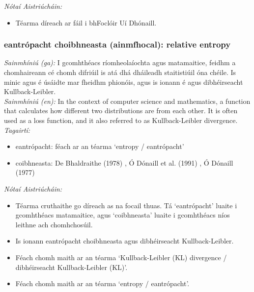  \noindent \textit{Nótaí Aistriúcháin:}
\begin{itemize}
	\item Téarma díreach ar fáil i bhFoclóir Uí Dhónaill.
\end{itemize}


\subsubsection*{eantrópacht choibhneasta (ainmfhocal): relative entropy}
 \noindent \textit{Sainmhíniú (ga):} I gcomhthéacs ríomheolaíochta agus matamaitice, feidhm a chomhaireann cé chomh difriúil is atá dhá dháileadh staitistiúil óna chéile. Is minic agus é úsáidte mar fheidhm phionóis, agus is ionann é agus dibhéirseacht Kullback-Leibler.
\\
 \noindent \textit{Sainmhíniú (en):} In the context of computer science and mathematics, a function that calculates how different two distributions are from each other. It is often used as a loss function, and it also referred to as Kullback-Leibler divergence.
\\
 \noindent \textit{Tagairtí:}
\begin{itemize}
	\item eantrópacht: féach ar an téarma `entropy / eantrópacht'
	\item coibhneasta: De Bhaldraithe (1978) \cite{de-bhaldraithe}, Ó Dónaill et al. (1991) \cite{focloir-beag}, Ó Dónaill (1977) \cite{odonaill}
\end{itemize}

 \noindent \textit{Nótaí Aistriúcháin:}
\begin{itemize}
	\item Téarma cruthaithe go díreach as na focail thuas. Tá `eantrópacht' luaite i gcomhthéacs matamaitice, agus `coibhneasta' luaite i gcomhthéacs níos leithne ach chomhchosúil.
	\item Is ionann eantrópacht choibhneasta agus dibhéirseacht Kullback-Leibler.
	\item Féach chomh maith ar an téarma `Kullback-Leibler (KL) divergence / dibhéirseacht Kullback-Leibler (KL)'.
	\item Féach chomh maith ar an téarma `entropy / eantrópacht'.
\end{itemize}


